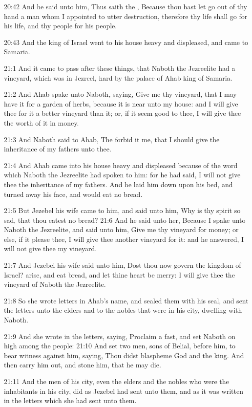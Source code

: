 20:42 And he said unto him, Thus saith the \LORD, Because thou hast let go out of thy hand a man whom I appointed to utter destruction, therefore thy life shall go for his life, and thy people for his people.

20:43 And the king of Israel went to his house heavy and displeased, and came to Samaria.

21:1 And it came to pass after these things, that Naboth the Jezreelite had a vineyard, which was in Jezreel, hard by the palace of Ahab king of Samaria.

21:2 And Ahab spake unto Naboth, saying, Give me thy vineyard, that I may have it for a garden of herbs, because it is near unto my house: and I will give thee for it a better vineyard than it; or, if it seem good to thee, I will give thee the worth of it in money.

21:3 And Naboth said to Ahab, The \LORD forbid it me, that I should give the inheritance of my fathers unto thee.

21:4 And Ahab came into his house heavy and displeased because of the word which Naboth the Jezreelite had spoken to him: for he had said, I will not give thee the inheritance of my fathers. And he laid him down upon his bed, and turned away his face, and would eat no bread.

21:5 But Jezebel his wife came to him, and said unto him, Why is thy spirit so sad, that thou eatest no bread?  21:6 And he said unto her, Because I spake unto Naboth the Jezreelite, and said unto him, Give me thy vineyard for money; or else, if it please thee, I will give thee another vineyard for it: and he answered, I will not give thee my vineyard.

21:7 And Jezebel his wife said unto him, Dost thou now govern the kingdom of Israel? arise, and eat bread, and let thine heart be merry: I will give thee the vineyard of Naboth the Jezreelite.

21:8 So she wrote letters in Ahab's name, and sealed them with his seal, and sent the letters unto the elders and to the nobles that were in his city, dwelling with Naboth.

21:9 And she wrote in the letters, saying, Proclaim a fast, and set Naboth on high among the people: 21:10 And set two men, sons of Belial, before him, to bear witness against him, saying, Thou didst blaspheme God and the king. And then carry him out, and stone him, that he may die.

21:11 And the men of his city, even the elders and the nobles who were the inhabitants in his city, did as Jezebel had sent unto them, and as it was written in the letters which she had sent unto them.

